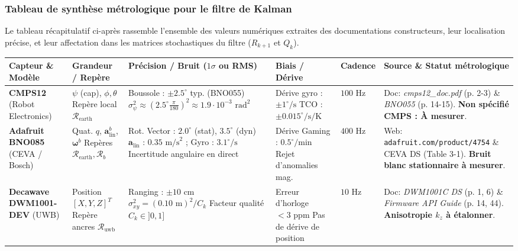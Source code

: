\documentclass[../Formulations_Kalman.tex]{subfiles}
\begin{document}
\subsubsection{Tableau de synthèse métrologique pour le filtre de Kalman}
Le tableau récapitulatif ci-après rassemble l'ensemble des valeurs numériques extraites des documentations constructeurs, leur localisation précise, et leur affectation dans les matrices stochastiques du filtre ($R_{k+1}$ et $Q_k$).

\begin{table}[htbp]
\centering
\scriptsize
\setlength{\tabcolsep}{3.5pt}
\begin{tabular}{p{2.6cm} p{2.2cm} p{3.2cm} p{2.5cm} p{1.1cm} p{4.0cm}}
\toprule
\textbf{Capteur \& Modèle} & \textbf{Grandeur / Repère} & \textbf{Précision / Bruit ($1\sigma$ ou RMS)} & \textbf{Biais / Dérive} & \textbf{Cadence} & \textbf{Source \& Statut métrologique} \\
\midrule
\textbf{CMPS12} \newline (Robot Electronics) & $\psi$ (cap), $\phi, \theta$ \newline Repère local $\mathcal{R}_{\text{earth}}$ & Boussole : $\pm 2.5^\circ$ typ. (BNO055) \newline $\sigma_{\psi}^2 \approx (2.5^\circ \frac{\pi}{180})^2 \approx 1.9\cdot 10^{-3}\text{ rad}^2$ & Dérive gyro : $\pm 1^\circ/\text{s}$ \newline TCO : $\pm 0.015^\circ/\text{s}/\text{K}$ & $100\text{ Hz}$ & Doc: \textit{cmps12\_doc.pdf} (p. 2-3) \& \textit{BNO055} (p. 14-15). \newline \textbf{Non spécifié CMPS : À mesurer}. \\
\midrule
\textbf{Adafruit BNO085} \newline (CEVA / Bosch) & Quat. $q$, $\mathbf{a}_{\text{lin}}^b$, $\boldsymbol{\omega}^b$ \newline Repères $\mathcal{R}_{\text{earth}}, \mathcal{R}_b$ & Rot. Vector : $2.0^\circ$ (stat), $3.5^\circ$ (dyn) \newline $\mathbf{a}_{\text{lin}}$ : $0.35\text{ m/s}^2$ ; Gyro : $3.1^\circ/\text{s}$ \newline Incertitude angulaire en direct & Dérive Gaming : $0.5^\circ/\text{min}$ \newline Rejet d'anomalies mag. & $400\text{ Hz}$ & Web: \texttt{adafruit.com/product/4754} \& CEVA DS (Table 3-1). \newline \textbf{Bruit blanc stationnaire à mesurer}. \\
\midrule
\textbf{Decawave DWM1001-DEV} \newline (UWB) & Position $[X,Y,Z]^T$ \newline Repère ancres $\mathcal{R}_{\text{uwb}}$ & Ranging : $\pm 10\text{ cm}$ \newline $\sigma_{xy}^2 = (0.10\text{ m})^2 / C_k$ \newline Facteur qualité $C_k \in ]0, 1]$ & Erreur d'horloge $< 3\text{ ppm}$ \newline Pas de dérive de position & $10\text{ Hz}$ & Doc: \textit{DWM1001C DS} (p. 1, 6) \& \textit{Firmware API Guide} (p. 14, 44). \newline \textbf{Anisotropie $k_z$ à étalonner}. \\

\end{tabular}
\end{table}
\end{document}
